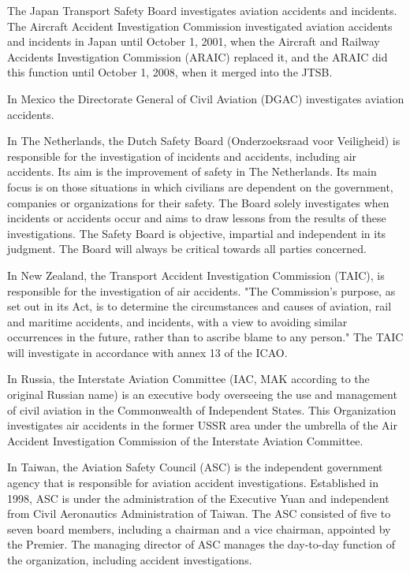 \documentclass[a4paper, 10pt]{article}
\begin{document}
The Japan Transport Safety Board investigates aviation accidents and incidents. The Aircraft Accident Investigation Commission investigated aviation accidents and incidents in Japan until October 1, 2001, when the Aircraft and Railway Accidents Investigation Commission (ARAIC) replaced it, and the ARAIC did this function until October 1, 2008, when it merged into the JTSB.\par

In Mexico the Directorate General of Civil Aviation (DGAC) investigates aviation accidents.\par

In The Netherlands, the Dutch Safety Board (Onderzoeksraad voor Veiligheid) is responsible for the investigation of incidents and accidents, including air accidents. Its aim is the improvement of safety in The Netherlands. Its main focus is on those situations in which civilians are dependent on the government, companies or organizations for their safety. The Board solely investigates when incidents or accidents occur and aims to draw lessons from the results of these investigations. The Safety Board is objective, impartial and independent in its judgment. The Board will always be critical towards all parties concerned.\par

In New Zealand, the Transport Accident Investigation Commission (TAIC), is responsible for the investigation of air accidents. "The Commission's purpose, as set out in its Act, is to determine the circumstances and causes of aviation, rail and maritime accidents, and incidents, with a view to avoiding similar occurrences in the future, rather than to ascribe blame to any person." The TAIC will investigate in accordance with annex 13 of the ICAO. \par

In Russia, the Interstate Aviation Committee (IAC, MAK according to the original Russian name) is an executive body overseeing the use and management of civil aviation in the Commonwealth of Independent States. This Organization investigates air accidents in the former USSR area under the umbrella of the Air Accident Investigation Commission of the Interstate Aviation Committee.\par

In Taiwan, the Aviation Safety Council (ASC) is the independent government agency that is responsible for aviation accident investigations. Established in 1998, ASC is under the administration of the Executive Yuan and independent from Civil Aeronautics Administration of Taiwan. The ASC consisted of five to seven board members, including a chairman and a vice chairman, appointed by the Premier. The managing director of ASC manages the day-to-day function of the organization, including accident investigations.\par
\end{document}
